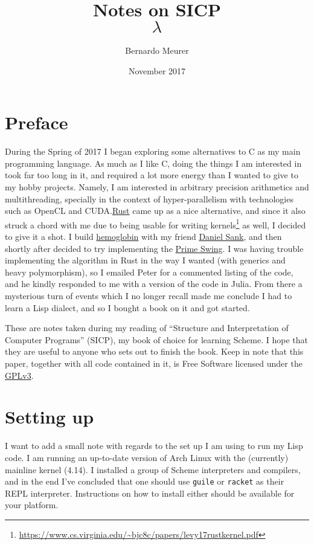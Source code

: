 \documentclass[11pt]{article}
\title{Notes on SICP
\vfill
{\fontsize{80}{0}\selectfont \[\lambda \]}
\vfill}
\date{November 2017}
\author{Bernardo Meurer}
\newcommand{\inline}{\texttt}
\begin{document}
\maketitle
\newpage

\section*{Preface}
During the Spring of 2017 I began exploring some alternatives to C as my main programming language. As much as I like C, doing the things I am interested in took far too long in it, and required a lot more energy than I wanted to give to my hobby projects. Namely, I am interested in arbitrary precision arithmetics and multithreading, specially in the context of hyper-parallelism with technologies such as OpenCL and CUDA.\@ \href{https://www.rust-lang.org/}{Rust} came up as a nice alternative, and since it also struck a chord with me due to being usable for writing kernels\footnote{\url{https://www.cs.virginia.edu/~bjc8c/papers/levy17rustkernel.pdf}} as well, I decided to give it a shot. I build \href{https://github.com/bemeurer/hemoglobin}{hemoglobin} with my friend \href{http://danielsank.github.io/}{Daniel Sank}, and then shortly after decided to try implementing the \href{http://www.luschny.de/math/factorial/SwingIntro.pdf}{Prime Swing}. I was having trouble implementing the algorithm in Rust in the way I wanted (with generics and heavy polymorphism), so I emailed Peter for a commented listing of the code, and he kindly responded to me with a version of the code in Julia. From there a mysterious turn of events which I no longer recall made me conclude I had to learn a Lisp dialect, and so I bought a book on it and got started.

These are notes taken during my reading of ``Structure and Interpretation of Computer Programs'' (SICP), my book of choice for learning Scheme. I hope that they are useful to anyone who sets out to finish the book. Keep in note that this paper, together with all code contained in it, is Free Software licensed under the \href{https://www.gnu.org/licenses/gpl.html}{GPLv3}.

\section*{Setting up}
I want to add a small note with regards to the set up I am using to run my Lisp code. I am running an up-to-date version of Arch Linux with the (currently) mainline kernel (4.14). I installed a group of Scheme interpreters and compilers, and in the end I've concluded that one should use \inline{guile} or \inline{racket} as their REPL interpreter. Instructions on how to install either should be available for your platform.
\end{document}
